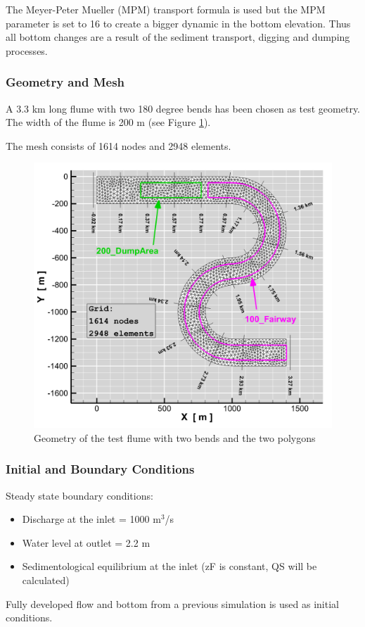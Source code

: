 The Meyer-Peter Mueller (MPM) transport formula is used but the MPM parameter is set to 16 to create a bigger dynamic in the bottom elevation. Thus all bottom changes are a result of the sediment transport, digging and dumping processes.  
%
%
\subsubsection{Geometry and Mesh}
%
A 3.3 km long flume with two 180 degree bends has been chosen as test geometry.
The width of the flume is 200 m  (see Figure \ref{grid}). 

The mesh consists of 1614 nodes and 2948 elements.

\begin{figure} [!h]
\centering
\includegraphics[scale=0.14]{../img/critDig_grid_Polys_2D.png}
\caption{Geometry of the test flume with two bends and the two polygons}\label{grid}
\end{figure}


%
%
\subsubsection{Initial and Boundary Conditions}
%
Steady state boundary conditions:
\begin{itemize}
\item{ Discharge at the inlet = 1000 m$^3$/s}
\item Water level at outlet = 2.2 m
\item Sedimentological equilibrium at the inlet (zF is constant, QS will be calculated)
\end{itemize}
Fully developed flow and bottom from a previous simulation is used as initial conditions.

